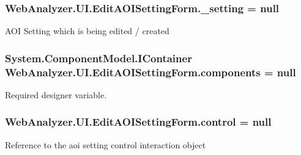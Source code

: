 \subsubsection[{\+\_\+setting}]{ Web\+Analyzer.\+U\+I.\+Edit\+A\+O\+I\+Setting\+Form.\+\_\+setting = null\hspace{0.3cm}{\ttfamily [private]}}\label{class_web_analyzer_1_1_u_i_1_1_edit_a_o_i_setting_form_ae746fef4ad5f71f921e0b1b9cec61cb7}


A\+O\+I Setting which is being edited / created 

\hypertarget{class_web_analyzer_1_1_u_i_1_1_edit_a_o_i_setting_form_a985bf45ba62ed1ac142143a2cf1abe1d}{}
\subsubsection[{components}]{\setlength{\rightskip}{0pt plus 5cm}System.\+Component\+Model.\+I\+Container Web\+Analyzer.\+U\+I.\+Edit\+A\+O\+I\+Setting\+Form.\+components = null\hspace{0.3cm}{\ttfamily [private]}}\label{class_web_analyzer_1_1_u_i_1_1_edit_a_o_i_setting_form_a985bf45ba62ed1ac142143a2cf1abe1d}


Required designer variable. 

\hypertarget{class_web_analyzer_1_1_u_i_1_1_edit_a_o_i_setting_form_a0b225becaa2adede20adbbc37c0263ee}{}
\subsubsection[{control}]{ Web\+Analyzer.\+U\+I.\+Edit\+A\+O\+I\+Setting\+Form.\+control = null\hspace{0.3cm}{\ttfamily [private]}}\label{class_web_analyzer_1_1_u_i_1_1_edit_a_o_i_setting_form_a0b225becaa2adede20adbbc37c0263ee}


Reference to the aoi setting control interaction object 

